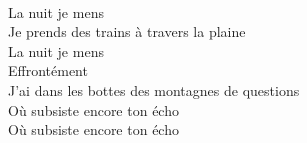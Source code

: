 \\
La nuit je mens \\
Je prends des trains à travers la plaine \\
La nuit je mens \\
Effrontément \\
J'ai dans les bottes des montagnes de questions \\
Où subsiste encore ton écho \\
Où subsiste encore ton écho \\
